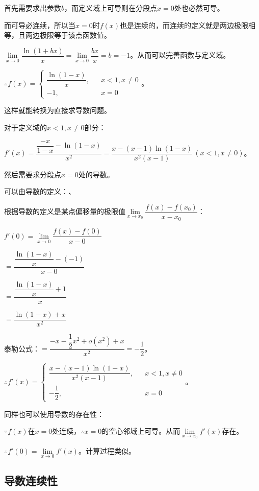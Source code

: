 首先需要求出参数$b$，而定义域上可导则在分段点$x=0$处也必然可导。

而可导必连续，所以当$x=0$时$f(x)$也是连续的，而连续的定义就是两边极限相等，且两边极限等于该点函数值。\medskip

$\lim\limits_{x\to 0}\dfrac{\ln(1+bx)}{x}=\lim\limits_{x\to 0}\dfrac{bx}{x}=b=-1$。从而可以完善函数与定义域。\medskip

$\therefore f(x)=\left\{\begin{array}{lcl}
                            \dfrac{\ln(1-x)}{x}, & & x<1,x\neq 0 \\
                            -1,                  & & x=0
\end{array}
\right.$。

这样就能转换为直接求导数问题。

对于定义域的$x<1,x\neq 0$部分：\medskip

$f'(x)=\dfrac{\dfrac{-x}{1-x}-\ln(1-x)}{x^2}=\dfrac{x-(x-1)\ln(1-x)}{x^2(x-1)}\,(x<1,x\neq 0)$。

然后需要求分段点$x=0$处的导数。

可以由导数的定义：、

根据导数的定义是某点偏移量的极限值$\lim\limits_{x\to x_0}\dfrac{f(x)-f(x_0)}{x-x_0}$：

$f'(0)=\lim\limits_{x\to 0}\dfrac{f(x)-f(0)}{x-0}$\medskip

$=\dfrac{\dfrac{\ln(1-x)}{x}-(-1)}{x-0}$\medskip

$=\dfrac{\dfrac{\ln(1-x)}{x}+1}{x}$\medskip

$=\dfrac{\ln(1-x)+x}{x^2}$

泰勒公式：$=\dfrac{-x-\dfrac{1}{2}x^2+o(x^2)+x}{x^2}=-\dfrac{1}{2}$。\medskip

$\therefore f'(x)=\left\{\begin{array}{lcl}
                             \dfrac{x-(x-1)\ln(1-x)}{x^2(x-1)}, & & x<1,x\neq 0 \\
                             -\dfrac{1}{2},                     & & x=0
\end{array}
\right.$。\medskip

同样也可以使用导数的存在性：

$\because f(x)$在$x=0$处连续，$\therefore x=0$的空心邻域上可导。从而$\lim\limits_{x\to x_0}f'(x)$存在。

$\therefore f'(0)=\lim\limits_{x\to 0}f'(x)$。计算过程类似。

\subsection{导数连续性}

